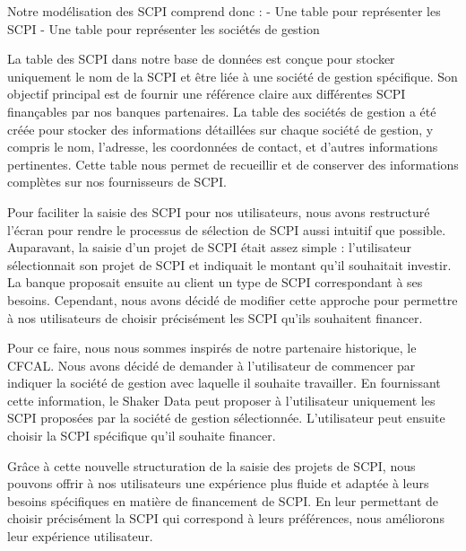 \documentclass[12pt,oneside,noprintercorrection]{iut}
\begin{document}
Notre modélisation des SCPI comprend donc :
- Une table pour représenter les SCPI
- Une table pour représenter les sociétés de gestion

La table des SCPI dans notre base de données est conçue pour stocker uniquement le nom de la SCPI et être liée à une société de gestion spécifique. Son objectif principal est de fournir une référence claire aux différentes SCPI finançables par nos banques partenaires. La table des sociétés de gestion a été créée pour stocker des informations détaillées sur chaque société de gestion, y compris le nom, l'adresse, les coordonnées de contact, et d'autres informations pertinentes. Cette table nous permet de recueillir et de conserver des informations complètes sur nos fournisseurs de SCPI.

Pour faciliter la saisie des SCPI pour nos utilisateurs, nous avons restructuré l'écran pour rendre le processus de sélection de SCPI aussi intuitif que possible. Auparavant, la saisie d'un projet de SCPI était assez simple : l'utilisateur sélectionnait son projet de SCPI et indiquait le montant qu'il souhaitait investir. La banque proposait ensuite au client un type de SCPI correspondant à ses besoins. Cependant, nous avons décidé de modifier cette approche pour permettre à nos utilisateurs de choisir précisément les SCPI qu'ils souhaitent financer.

Pour ce faire, nous nous sommes inspirés de notre partenaire historique, le CFCAL. Nous avons décidé de demander à l'utilisateur de commencer par indiquer la société de gestion avec laquelle il souhaite travailler. En fournissant cette information, le Shaker Data peut proposer à l'utilisateur uniquement les SCPI proposées par la société de gestion sélectionnée. L'utilisateur peut ensuite choisir la SCPI spécifique qu'il souhaite financer.

Grâce à cette nouvelle structuration de la saisie des projets de SCPI, nous pouvons offrir à nos utilisateurs une expérience plus fluide et adaptée à leurs besoins spécifiques en matière de financement de SCPI. En leur permettant de choisir précisément la SCPI qui correspond à leurs préférences, nous améliorons leur expérience utilisateur.

\clearpage
\end{document}
